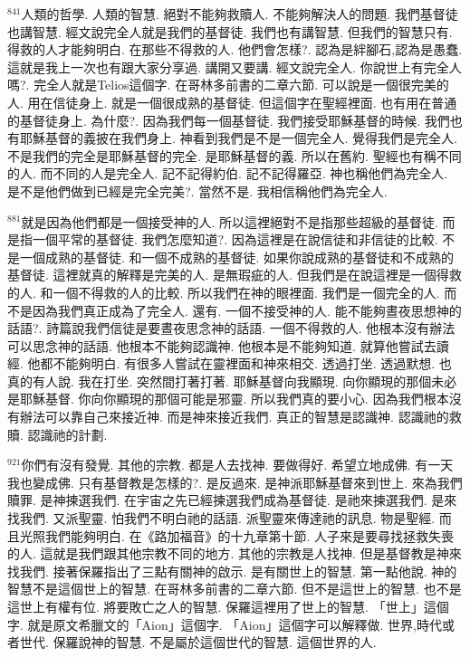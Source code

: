 \documentclass{book}
\begin{document}
$^{841}$人類的哲學.
人類的智慧.
絕對不能夠救贖人.
不能夠解決人的問題.
我們基督徒也講智慧.
經文說完全人就是我們的基督徒.
我們也有講智慧.
但我們的智慧只有.
得救的人才能夠明白.
在那些不得救的人.
他們會怎樣?.
認為是絆腳石,認為是愚蠢.
這就是我上一次也有跟大家分享過.
講開又要講.
經文說完全人.
你說世上有完全人嗎?.
完全人就是Telios這個字.
在哥林多前書的二章六節.
可以說是一個很完美的人.
用在信徒身上.
就是一個很成熟的基督徒.
但這個字在聖經裡面.
也有用在普通的基督徒身上.
為什麼?.
因為我們每一個基督徒.
我們接受耶穌基督的時候.
我們也有耶穌基督的義披在我們身上.
神看到我們是不是一個完全人.
覺得我們是完全人.
不是我們的完全是耶穌基督的完全.
是耶穌基督的義.
所以在舊約.
聖經也有稱不同的人.
而不同的人是完全人.
記不記得約伯.
記不記得羅亞.
神也稱他們為完全人.
是不是他們做到已經是完全完美?.
當然不是.
我相信稱他們為完全人.

$^{881}$就是因為他們都是一個接受神的人.
所以這裡絕對不是指那些超級的基督徒.
而是指一個平常的基督徒.
我們怎麼知道?.
因為這裡是在說信徒和非信徒的比較.
不是一個成熟的基督徒.
和一個不成熟的基督徒.
如果你說成熟的基督徒和不成熟的基督徒.
這裡就真的解釋是完美的人.
是無瑕疵的人.
但我們是在說這裡是一個得救的人.
和一個不得救的人的比較.
所以我們在神的眼裡面.
我們是一個完全的人.
而不是因為我們真正成為了完全人.
還有.
一個不接受神的人.
能不能夠晝夜思想神的話語?.
詩篇說我們信徒是要晝夜思念神的話語.
一個不得救的人.
他根本沒有辦法可以思念神的話語.
他根本不能夠認識神.
他根本是不能夠知道.
就算他嘗試去讀經.
他都不能夠明白.
有很多人嘗試在靈裡面和神來相交.
透過打坐.
透過默想.
也真的有人說.
我在打坐.
突然間打著打著.
耶穌基督向我顯現.
向你顯現的那個未必是耶穌基督.
你向你顯現的那個可能是邪靈.
所以我們真的要小心.
因為我們根本沒有辦法可以靠自己來接近神.
而是神來接近我們.
真正的智慧是認識神.
認識祂的救贖.
認識祂的計劃.

$^{921}$你們有沒有發覺.
其他的宗教.
都是人去找神.
要做得好.
希望立地成佛.
有一天我也變成佛.
只有基督教是怎樣的?.
是反過來.
是神派耶穌基督來到世上.
來為我們贖罪.
是神揀選我們.
在宇宙之先已經揀選我們成為基督徒.
是祂來揀選我們.
是來找我們.
又派聖靈.
怕我們不明白祂的話語.
派聖靈來傳達祂的訊息.
物是聖經.
而且光照我們能夠明白.
在《路加福音》的十九章第十節.
人子來是要尋找拯救失喪的人.
這就是我們跟其他宗教不同的地方.
其他的宗教是人找神.
但是基督教是神來找我們.
接著保羅指出了三點有關神的啟示.
是有關世上的智慧.
第一點他說.
神的智慧不是這個世上的智慧.
在哥林多前書的二章六節.
但不是這世上的智慧.
也不是這世上有權有位.
將要敗亡之人的智慧.
保羅這裡用了世上的智慧.
「世上」這個字.
就是原文希臘文的「Aion」這個字.
「Aion」這個字可以解釋做.
世界,時代或者世代.
保羅說神的智慧.
不是屬於這個世代的智慧.
這個世界的人.
\end{document}
